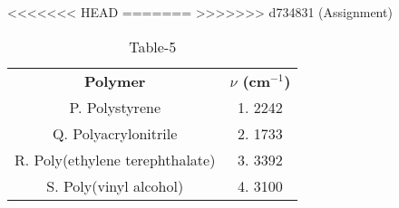 \begin{table}[htbp]
  \centering
  \caption{Table-5}
<<<<<<< HEAD
  \label{tab:table/table5.tex}
=======
  \label{table5}
>>>>>>> d734831 (Assignment)
  \begin{tabular}{cc}
\textbf{Polymer} & \textbf{$\nu$ (cm$^{-1}$)}\\

P. Polystyrene & 1. 2242\\
Q. Polyacrylonitrile & 2. 1733\\
R. Poly(ethylene terephthalate) & 3. 3392\\
S. Poly(vinyl alcohol) & 4. 3100\\
  
  
  
  \end{tabular}
\end{table}